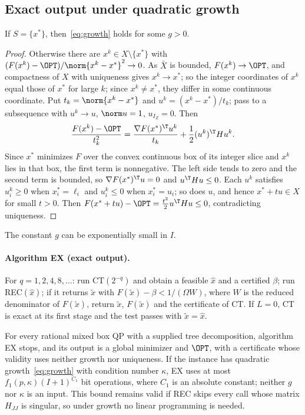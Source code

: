 \subsection{Exact output under quadratic growth}

\begin{lemma}\label{lem:unique-growth}
If $S=\{x^*\}$, then~\eqref{eq:growth} holds for some $g>0$.
\end{lemma}

\begin{proof}
Otherwise there are $x^k\in X\setminus\{x^*\}$ with
$(F(x^k)-\OPT)/\norm{x^k-x^*}^2\to0$. As $\bar X$ is bounded,
$F(x^k)\to\OPT$, and compactness of $X$ with uniqueness gives $x^k\to x^*$;
so the integer coordinates of $x^k$ equal those of $x^*$ for large $k$;
since $x^k\ne x^*$, they differ in some continuous coordinate. Put
$t_k=\norm{x^k-x^*}$ and
$u^k=(x^k-x^*)/t_k$; pass to a subsequence with $u^k\to u$, $\norm u=1$,
$u_{I_Z}=0$. Then
\[
\frac{F(x^k)-\OPT}{t_k^2}=\frac{\nabla F(x^*)^{\T}u^k}{t_k}
+\frac12(u^k)^{\T}Hu^k .
\]
Since $x^*$ minimizes $F$ over the convex continuous box of its integer slice
and $x^k$ lies in that box, the first term is nonnegative. The left side
tends to zero and the second term is bounded, so
$\nabla F(x^*)^{\T}u=0$ and $u^{\T}Hu\le0$. Each $u^k$ satisfies
$u^k_i\ge0$ when $x^*_i=\ell_i$ and $u^k_i\le0$ when $x^*_i=u_i$; so does
$u$, and hence $x^*+tu\in X$ for small $t>0$. Then
$F(x^*+tu)-\OPT=\frac{t^2}2u^{\T}Hu\le0$, contradicting uniqueness.
\end{proof}

The constant $g$ can be exponentially small in $I$.

\paragraph{Algorithm EX (exact output).}
For $q=1,2,4,8,\dots$: run CT$(2^{-q})$ and obtain a feasible $\hat x$ and a
certified $\beta$; run REC$(\hat x)$; if it returns $\tilde x$ with
$F(\tilde x)-\beta<1/(\Omega W)$, where $W$ is the reduced denominator of
$F(\tilde x)$, return $\tilde x$, $F(\tilde x)$ and the certificate of
CT. If $L=0$, CT is exact at its first stage and the test passes with
$\tilde x=\hat x$.

\begin{theorem}\label{thm:exact}
For every rational mixed box QP with a supplied tree decomposition, algorithm
EX stops, and its output is a global minimizer and $\OPT$, with a certificate
whose validity uses neither growth nor uniqueness. If the instance has
quadratic growth~\eqref{eq:growth} with condition number $\kappa$, EX uses
at most $f_1(p,\kappa)(I+1)^{C_1}$ bit operations, where $C_1$ is an absolute
constant; neither $g$ nor $\kappa$ is an input. This bound remains valid if
REC skips
every call whose matrix $H_{JJ}$ is singular, so under growth no linear
programming is needed.
\end{theorem}

